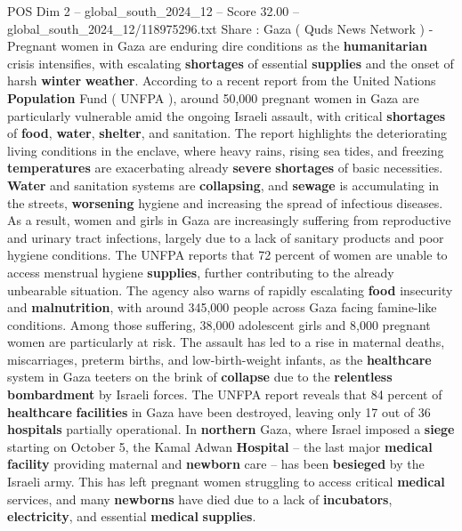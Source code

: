 \begin{textsample}{POS Dim 2 – global\_south\_2024\_12 – Score 32.00 – global\_south\_2024\_12/118975296.txt}  \label{ex:f2_pos_062}
Share : Gaza ( Quds News Network ) - Pregnant women in Gaza are enduring dire conditions as the \textbf{humanitarian} crisis intensifies, with escalating \textbf{shortages} of essential \textbf{supplies} and the onset of harsh \textbf{winter} \textbf{weather}.
According to a recent report from the United Nations \textbf{Population} Fund ( UNFPA ), around 50,000 pregnant women in Gaza are particularly vulnerable amid the ongoing Israeli assault, with critical \textbf{shortages} of \textbf{food}, \textbf{water}, \textbf{shelter}, and sanitation.
The report highlights the deteriorating living conditions in the enclave, where heavy rains, rising sea tides, and freezing \textbf{temperatures} are exacerbating already \textbf{severe} \textbf{shortages} of basic necessities. \textbf{Water} and sanitation systems are \textbf{collapsing}, and \textbf{sewage} is accumulating in the streets, \textbf{worsening} hygiene and increasing the spread of infectious diseases.
As a result, women and girls in Gaza are increasingly suffering from reproductive and urinary tract infections, largely due to a lack of sanitary products and poor hygiene conditions.
The UNFPA reports that 72 percent of women are unable to access menstrual hygiene \textbf{supplies}, further contributing to the already unbearable situation.
The agency also warns of rapidly escalating \textbf{food} insecurity and \textbf{malnutrition}, with around 345,000 people across Gaza facing famine-like conditions.
Among those suffering, 38,000 adolescent girls and 8,000 pregnant women are particularly at risk.
The assault has led to a rise in maternal deaths, miscarriages, preterm births, and low-birth-weight infants, as the \textbf{healthcare} system in Gaza teeters on the brink of \textbf{collapse} due to the \textbf{relentless} \textbf{bombardment} by Israeli forces.
The UNFPA report reveals that 84 percent of \textbf{healthcare} \textbf{facilities} in Gaza have been destroyed, leaving only 17 out of 36 \textbf{hospitals} partially operational.
In \textbf{northern} Gaza, where Israel imposed a \textbf{siege} starting on October 5, the Kamal Adwan \textbf{Hospital} -- the last major \textbf{medical} \textbf{facility} providing maternal and \textbf{newborn} care -- has been \textbf{besieged} by the Israeli army.
This has left pregnant women struggling to access critical \textbf{medical} services, and many \textbf{newborns} have died due to a lack of \textbf{incubators}, \textbf{electricity}, and essential \textbf{medical} \textbf{supplies}.

\end{textsample}

